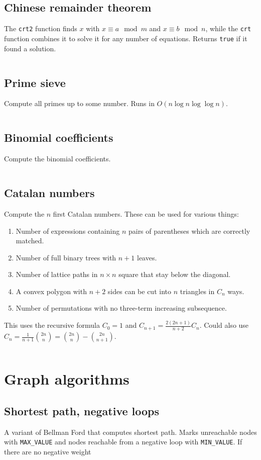 \documentclass[10pt,a4paper,landscape,oneside]{amsart}
\newcommand{\code}[1]{\inputminted[fontsize=\large,tabsize=2,baselinestretch=1]{java}{#1}}
\begin{document}
\begin{multicols*}{2}
\subsection{Chinese remainder theorem}
The \texttt{crt2} function finds \(x\) with \(x \equiv a \mod m\) and \(x \equiv b \mod
n\), while the \texttt{crt} function combines it to solve it for any number of equations.
Returns \texttt{true} if it found a solution.
\code{number-theory/crt.java}
\subsection{Prime sieve}
Compute all primes up to some number. Runs in \(O(n \log n \log \log n)\).
\code{number-theory/sieve.java}
\subsection{Binomial coefficients}
Compute the binomial coefficients.
\code{number-theory/binom.java}
\subsection{Catalan numbers}
Compute the \(n\) first Catalan numbers. These can be used for various things:
\begin{enumerate}
  \item Number of expressions containing \(n\) pairs of parentheses which are correctly
    matched.
  \item Number of full binary trees with \(n+1\) leaves.
  \item Number of lattice paths in \(n \times n\) square that stay below the diagonal.
  \item A convex polygon with \(n+2\) sides can be cut into \(n\) triangles in \(C_n\)
    ways.
  \item Number of permutations with no three-term increasing subsequence.
\end{enumerate}
This uses the recursive formula \(C_0 = 1\) and \(C_{n+1} = \frac{2(2n+1)}{n+2} C_n\).
Could also use \(C_n = \frac{1}{n+1}\binom{2n}{n} = \binom{2n}{n} - \binom{2n}{n+1}\).
\code{number-theory/catalan.java}

\section{Graph algorithms}
\subsection{Shortest path, negative loops}
A variant of Bellman Ford that computes shortest path. Marks unreachable nodes with
\verb|MAX_VALUE| and nodes reachable from a negative loop with \verb|MIN_VALUE|.
If there are no negative weight
\code{graph/shortest-path.java}

\end{multicols*}
\end{document}
